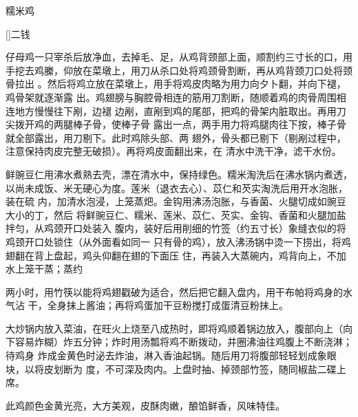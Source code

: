 \begin{recipe}[八宝糯米鸡]{糯米鸡}

\ingredients

[\footnotemark]{二钱}

\preparation

\step 仔母鸡一只宰杀后放净血，去掉毛、足，从鸡背颈部上面，顺割约三寸长的口，用
手挖去鸡縢，仰放在菜墩上，用刀从杀口处将鸡颈骨割断，再从鸡背颈刀口处将颈骨拉出
。然后将鸡立放在菜墩上，用手将鸡皮肉略为用力向夕卜翻，并向下褪，鸡骨架就逐渐露
出。鸡翅膀与胸腔骨相连的筋用刀割断，随顺着鸡的肉骨周围相连地方慢慢往下剐，边褪
边剐，直剐到鸡的尾部，把鸡的骨架内脏取出。再用刀尖拨开鸡的两腿棒子骨，使棒子骨
露出一点，两手用力将鸡腿肉往下按，棒子骨就全部露出，用刀剔下。此时鸡除头部、两
翅外，骨头都已剔下（剔剐过程中，注意保持肉皮完整无破损）。再将鸡皮面翻出来，在
清水中洗干净，滤干水份。

\step 鲜豌豆仁用沸水煮熟去壳，漂在清水中，保持绿色。糯米淘洗后在沸水锅内煮透，
以尚未成饭、米无硬心为度。莲米（退衣去心）、苡仁和芡实淘洗后用开水泡胀，装在硫
内，加清水泡浸，上笼蒸𤆵。金钩用沸汤泡胀，与香菌、火腿切成如豌豆大小的丁，然后
将鲜豌豆仁、糯米、莲米、苡仁、芡实、金钩、香菌和火腿加盐拌匀，从鸡颈开口处装入
腹内，装好后用削细的竹签（约五寸长）象缝衣似的将鸡颈开口处锁住（从外面看如同一
只有骨的鸡），放入沸汤锅中烫一下捞出，将鸡翅翻在背上盘起，鸡头仰翻在翅的下面压
住，再装入大蒸碗内，鸡背向上，不加水上笼干蒸；蒸约

两小时，用竹筷以能将鸡翅戳破为适合，然后把它翻入盘内，用干布帕将鸡身的水气沾
干，全身抹上酱油；再将鸡蛋加干豆粉搅打成蛋清豆粉抹上。

\step 大炒锅内放入菜油，在旺火上烧至八成热时，即将鸡顺着锅边放入，腹部向上（向
下容易炸糊）炸五分钟；炸时用汤瓢将鸡不断拨动，并圈沸油往鸡腹上不断浇淋；待鸡身
炸成金黄色时泌去炸油，淋入香油起锅。随后用刀将腹部轻轻划成象眼块，以将皮划断为
度，不可深及肉内。上盘时抽、掉颈部竹签，随同椒盐二碟上席。

\features

此鸡颜色金黄光亮，大方美观，皮酥肉嫩，酿馅鲜香，风味特佳。


\end{recipe}

